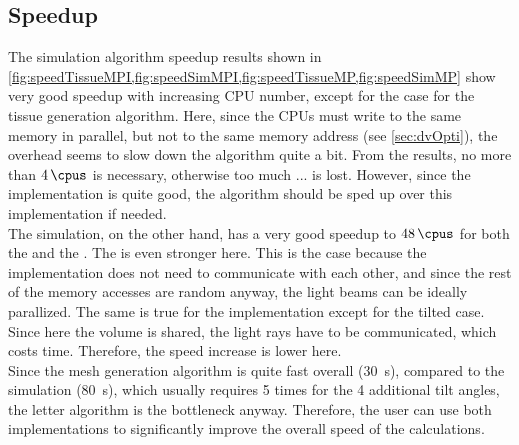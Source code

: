 \subsection{Speedup} 
% 
The simulation algorithm speedup results shown in \cref{fig:speedTissueMPI,fig:speedSimMPI,fig:speedTissueMP,fig:speedSimMP} show very good speedup with increasing \ac{CPU} number, except for the \openmp{} case for the tissue generation algorithm.
Here, since the \acsp{CPU} must write to the same memory in parallel, but not to the same memory address (see \cref{sec:dvOpti}), the overhead seems to slow down the algorithm quite a bit.
From the results, no more than $\SI{4}{\cpus}$ is necessary, otherwise too much ... is lost.
However, since the \mpi{} implementation is quite good, the algorithm should be sped up over this implementation if needed.
\\
% 
The simulation, on the other hand, has a very good speedup to $\SI{48}{\cpus}$ for both the \mpi{} and the \openmp{}.
The \openmp{} is even stronger here.
This is the case because the \openmp{} implementation does not need to communicate with each other, and since the rest of the memory accesses are random anyway, the light beams can be ideally parallized.
The same is true for the \mpi{} implementation except for the tilted case.
Since here the volume is shared, the light rays have to be communicated, which costs time.
Therefore, the speed increase is lower here.
\\
% 
Since the mesh generation algorithm is quite fast overall (\SI{30}{\second}), compared to the simulation (\SI{80}{\second}), which usually requires 5 times for the 4 additional tilt angles, the letter algorithm is the bottleneck anyway.
Therefore, the user can use both implementations to significantly improve the overall speed of the calculations.
% 
% 
% 
